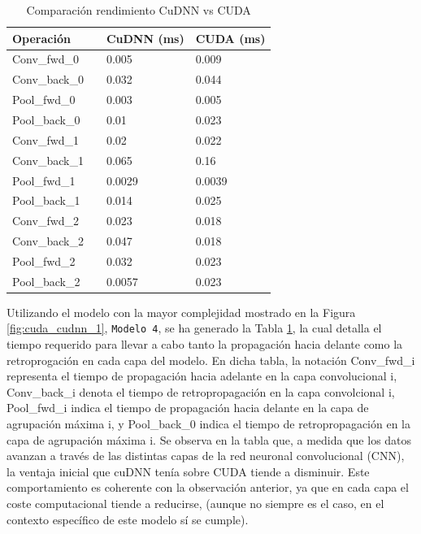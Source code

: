 \begin{table}[H]
	\centering
	\begin{tabular}{llll}
		Operación 	 &\vline  & CuDNN (ms) & CUDA (ms)  \\
		\hline
		
		Conv\_fwd\_0    & \vline & 0.005	 &	0.009 \\			
		Conv\_back\_0   & \vline & 	0.032 &	0.044 \\
		\hline
		Pool\_fwd\_0 	 & \vline & 0.003	 &	0.005 \\
		Pool\_back\_0 	 & \vline & 0.01    &	0.023 \\
		\hline
		\hline
		\hline
		Conv\_fwd\_1    & \vline & 0.02	 &	0.022	\\			
		Conv\_back\_1   & \vline & 0.065	 &	0.16	\\
		\hline
		Pool\_fwd\_1 	 & \vline & 0.0029	 &	0.0039	 \\
		Pool\_back\_1 	 & \vline  & 0.014    &	0.025	 \\
		\hline
		\hline
		\hline
		Conv\_fwd\_2    & \vline & 0.023	 &	0.018 \\			
		Conv\_back\_2   & \vline & 0.047	 &	0.018 \\
		\hline
		Pool\_fwd\_2 	 & \vline & 0.032	 &	0.023 \\
		Pool\_back\_2 	 & \vline & 0.0057    &	0.023 \\	
	\end{tabular}
	\caption{Comparación rendimiento CuDNN vs CUDA}
	\label{tabla_resultados}
\end{table}

Utilizando el modelo con la mayor complejidad mostrado en la Figura \ref{fig:cuda_cudnn_1}, \texttt{Modelo 4}, se ha generado la Tabla \ref{tabla_resultados}, la cual detalla el tiempo requerido para llevar a cabo tanto la propagación hacia delante como la retroprogación en cada capa del modelo. En dicha tabla, la notación Conv\_fwd\_i representa el tiempo de propagación hacia adelante en la capa convolucional i, Conv\_back\_i denota el tiempo de retropropagación en la capa convolcional i, Pool\_fwd\_i indica el tiempo de propagación hacia delante en la capa de agrupación máxima i, y Pool\_back\_0 indica el tiempo de retropropagación en la capa de agrupación máxima i.
Se observa en la tabla que, a medida que los datos avanzan a través de las distintas capas de la red neuronal convolucional (CNN), la ventaja inicial que cuDNN tenía sobre CUDA tiende a disminuir. Este comportamiento es coherente con la observación anterior, ya que en cada capa el coste computacional tiende a reducirse, (aunque no siempre es el caso, en el contexto específico de este modelo sí se cumple).